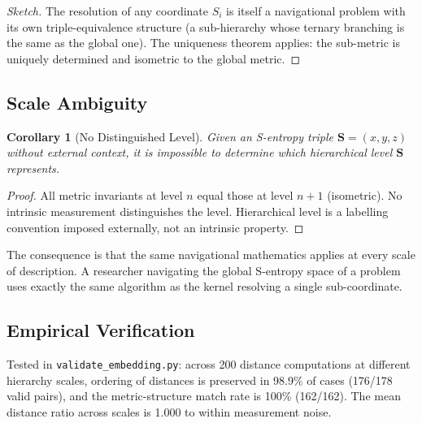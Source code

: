 \documentclass[twocolumn,11pt,a4paper]{article}
\newtheorem{corollary}[theorem]{Corollary}
\begin{document}
\begin{proof}[Sketch]
The resolution of any coordinate $S_i$ is itself a navigational problem with its own triple-equivalence structure (a sub-hierarchy whose ternary branching is the same as the global one). The uniqueness theorem applies: the sub-metric is uniquely determined and isometric to the global metric.
\end{proof}

\subsection{Scale Ambiguity}

\begin{corollary}[No Distinguished Level]
Given an S-entropy triple $\mathbf{S} = (x, y, z)$ without external context, it is impossible to determine which hierarchical level $\mathbf{S}$ represents.
\end{corollary}

\begin{proof}
All metric invariants at level $n$ equal those at level $n+1$ (isometric). No intrinsic measurement distinguishes the level. Hierarchical level is a labelling convention imposed externally, not an intrinsic property.
\end{proof}

The consequence is that the same navigational mathematics applies at every scale of description. A researcher navigating the global S-entropy space of a problem uses exactly the same algorithm as the kernel resolving a single sub-coordinate.

\subsection{Empirical Verification}

Tested in \texttt{validate\_embedding.py}: across 200 distance computations at different hierarchy scales, ordering of distances is preserved in 98.9\% of cases (176/178 valid pairs), and the metric-structure match rate is 100\% (162/162). The mean distance ratio across scales is 1.000 to within measurement noise.
\end{document}
